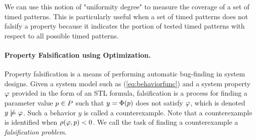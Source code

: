 We can use this notion of "uniformity degree" to measure the coverage of a set of timed patterns. This is particularly useful when a set of timed patterns does not  falsify a property because it indicates the portion of tested timed patterns with respect to all possible timed patterns.




\paragraph{Property Falsification using Optimization.}	

Property falsification is a means of performing automatic bug-finding in system designs.
Given a system model such as (\ref{eq:behaviorfunc}) and a system property $\varphi$ provided in the form of an STL formula, 
falsification is a process for finding a parameter value $p \in P$
such that $y=\Phi(p)$ does not satisfy $\varphi$, which is denoted $y
\not\models \varphi$. Such a behavior $y$ is called a counterexample. 
Note that a counterexample is identified when 
$\rho(\varphi,p)<0$. We call the task of finding a counterexample 
a {\em falsification problem}. 


